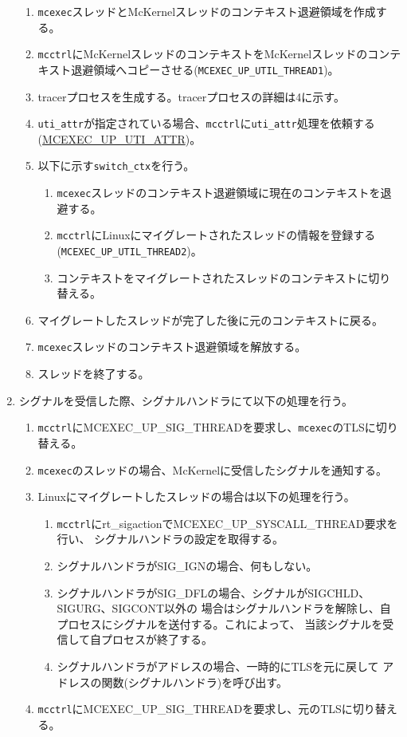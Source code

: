 \documentclass[twoside,11pt,fleqn]{book}
\newcommand\textttw[1]{\mathchardef\UrlBreakPenalty=100\mathchardef\UrlBigBreakPenalty=100\url{#1}}
\begin{document}
\begin{enumerate}
\begin{enumerate}
\item \texttt{mcexec}スレッドとMcKernelスレッドのコンテキスト退避領域を作成する。
\item \texttt{mcctrl}にMcKernelスレッドのコンテキストをMcKernelスレッドのコンテキスト退避領域へコピーさせる(\texttt{MCEXEC\_UP\_UTIL\_THREAD1})。
\item tracerプロセスを生成する。tracerプロセスの詳細は4に示す。
\item \texttt{uti\_attr}が指定されている場合、\texttt{mcctrl}に\texttt{uti\_attr}処理を依頼する\\
(\textttw{MCEXEC\_UP\_UTI\_ATTR})。
\item 以下に示す\texttt{switch\_ctx}を行う。
\begin{enumerate}
\item \texttt{mcexec}スレッドのコンテキスト退避領域に現在のコンテキストを退避する。
\item \texttt{mcctrl}にLinuxにマイグレートされたスレッドの情報を登録する\\(\texttt{MCEXEC\_UP\_UTIL\_THREAD2})。
\item コンテキストをマイグレートされたスレッドのコンテキストに切り替える。
\end{enumerate}
\item マイグレートしたスレッドが完了した後に元のコンテキストに戻る。
\item \texttt{mcexec}スレッドのコンテキスト退避領域を解放する。
\item スレッドを終了する。
\end{enumerate}


\item シグナルを受信した際、シグナルハンドラにて以下の処理を行う。
\begin{enumerate}
\item \texttt{mcctrl}にMCEXEC\_UP\_SIG\_THREADを要求し、\texttt{mcexec}のTLSに切り替える。
\item \texttt{mcexec}のスレッドの場合、McKernelに受信したシグナルを通知する。
\item Linuxにマイグレートしたスレッドの場合は以下の処理を行う。
\begin{enumerate}
\item \texttt{mcctrl}にrt\_sigactionでMCEXEC\_UP\_SYSCALL\_THREAD要求を行い、
シグナルハンドラの設定を取得する。
\item シグナルハンドラがSIG\_IGNの場合、何もしない。
\item シグナルハンドラがSIG\_DFLの場合、シグナルがSIGCHLD、SIGURG、SIGCONT以外の
場合はシグナルハンドラを解除し、自プロセスにシグナルを送付する。これによって、
当該シグナルを受信して自プロセスが終了する。
\item シグナルハンドラがアドレスの場合、一時的にTLSを元に戻して
アドレスの関数(シグナルハンドラ)を呼び出す。
\end{enumerate}
\item \texttt{mcctrl}にMCEXEC\_UP\_SIG\_THREADを要求し、元のTLSに切り替える。
\end{enumerate}



\end{enumerate}
\end{document}
